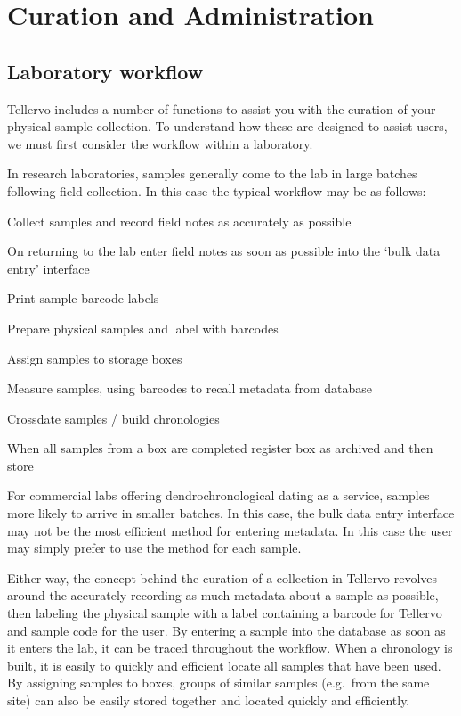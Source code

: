 \chapter{Curation and Administration}


\section{Laboratory workflow}
Tellervo includes a number of functions to assist you with the curation of your physical sample collection.  To understand how these are designed to assist users, we must first consider the workflow within a laboratory.

In research laboratories, samples generally come to the lab in large batches following field collection.   In this case the typical workflow may be as follows:

\begin{enumerate*}
 \item Collect samples and record field notes as accurately as possible
 \item On returning to the lab enter field notes as soon as possible into the `bulk data entry' interface
 \item Print sample barcode labels
 \item Prepare physical samples and label with barcodes
 \item Assign samples to storage boxes
 \item Measure samples, using barcodes to recall metadata from database
 \item Crossdate samples / build chronologies
 \item When all samples from a box are completed register box as archived and then store
\end{enumerate*}

For commercial labs offering dendrochronological dating as a service, samples more likely to arrive in smaller batches.  In this case, the bulk data entry interface may not be the most efficient method for entering metadata.  In this case the user may simply prefer to use the  method for each sample.  

Either way, the concept behind the curation of a collection in Tellervo revolves around the accurately recording as much metadata about a sample as possible, then labeling the physical sample with a label containing a barcode for Tellervo and sample code for the user.  By entering a sample into the database as soon as it enters the lab, it can be traced throughout the workflow.  When a chronology is built, it is easily to quickly and efficient locate all samples that have been used.  By assigning samples to boxes, groups of similar samples (e.g.\ from the same site) can also be easily stored together and located quickly and efficiently.  


